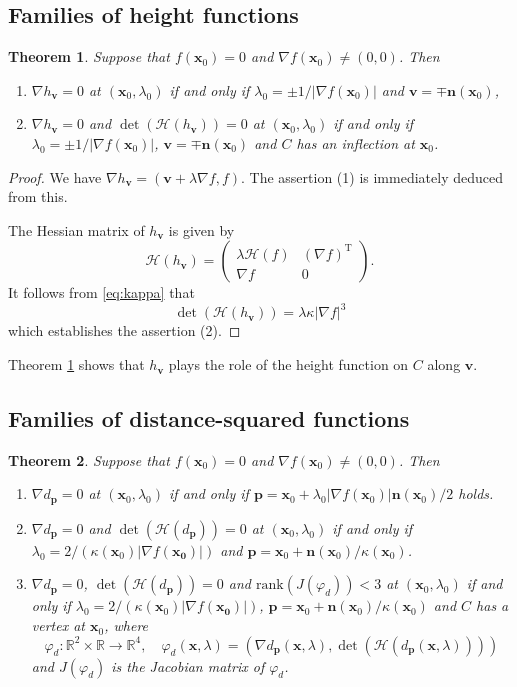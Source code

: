 \documentclass[12pt]{amsart}
\theoremstyle{plain}
\newtheorem{theorem}{Theorem}[section]
\theoremstyle{definition}
\newcommand{\R}{\mathbb{R}}
\newcommand{\n}{\mathbf{n}}
\renewcommand{\v}{\mathbf{v}}
\newcommand{\x}{\mathbf{x}}
\newcommand{\p}{\mathbf{p}}
\renewcommand{\phi}{\varphi}
\newcommand{\rank}{\mathrm{rank}}
\begin{document}
\subsection{Families of height functions}

\begin{theorem}
\label{thm:height}
Suppose that $f(\x_0)=0$ and $\nabla f(\x_0)\ne(0,0)$. Then
\begin{enumerate}
\item 
$\nabla h_{\v}=0$ at $(\x_0,\lambda_0)$ if and only if $\lambda_0=\pm 1/|\nabla f(\x_0)|$ and $\v=\mp \n(\x_0)$,  
\item 
$\nabla h_{\v}=0$ and $\det(\mathcal{H}(h_{\v}))=0$ at $(\x_0,\lambda_0)$ if and only if $\lambda_0=\pm 1/|\nabla f(\x_0)|$, $\v=\mp \n(\x_0)$ and $C$ has an inflection at $\x_0$.
 \end{enumerate}
\end{theorem}
\begin{proof}
We have $\nabla h_\v = (\v + \lambda \nabla f, f)$.
The assertion (1) is immediately deduced from this.
 
The Hessian matrix of $h_\v$ is given by
\[
\mathcal{H}(h_\v)
= 
\begin{pmatrix}
\lambda \mathcal{H}(f) & (\nabla f)^\mathrm{T} \\
\nabla f & 0
\end{pmatrix}.
\]
It follows from \eqref{eq:kappa} that
$$
\det(\mathcal{H}(h_\v)) = \lambda \kappa|\nabla f|^3 
$$
which establishes the assertion (2).
\end{proof}
Theorem \ref{thm:height} shows that $h_{\v}$ plays the role of the height function on $C$ along $\v$.

\subsection{Families of distance-squared functions}

\begin{theorem}
\label{thm:distance}
Suppose that $f(\x_0)=0$ and $\nabla f(\x_0)\ne(0,0)$. Then
\begin{enumerate}
\item
$\nabla d_{\p}=0$ at $(\x_0,\lambda_0)$ if and only if $\p=\x_0+\lambda_0|\nabla f(\x_0)|\n(\x_0)/2$ holds.
\item
$\nabla d_{\p}=0$ and $\det(\mathcal{H}(d_{\p}))=0$ at $(\x_0,\lambda_0)$ if and only if $\lambda_0=2/(\kappa(\x_0)|\nabla f(\bm{x_0})|)$ and $\p=\x_0+\n(\x_0)/\kappa(\x_0)$. 
\item 
$\nabla d_{\p}=0$, $\det(\mathcal{H}(d_{\p}))=0$ and $\rank(J(\phi_d))<3$ at $(\x_0,\lambda_0)$ if and only if $\lambda_0=2/(\kappa(\x_0)|\nabla f(\bm{x_0})|)$, $\p=\x_0+\n(\x_0)/\kappa(\x_0)$ and $C$ has a vertex at $\x_0$, where
\[
\phi_d:\R^2\times\R\to\R^4,\quad \phi_d(\x,\lambda) =(\nabla d_{\p}(\x,\lambda),\det(\mathcal{H}(d_{\p}(\x,\lambda)))) 
\]
and $J(\phi_d)$ is the Jacobian matrix of $\phi_{d}$. 
\end{enumerate}
\end{theorem}
\end{document}

